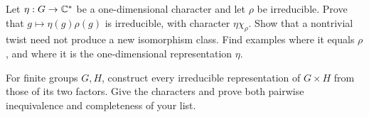 
\begin{exo}
\label{exo-irred-representation-degre-1}
Let $\eta:G\to\mathbb{C}^*$ be a one-dimensional character and let $\rho$
be irreducible. Prove that $g\mapsto\eta(g)\rho(g)$ is irreducible,
with character $\eta\chi_\rho$. Show that a nontrivial twist need not
produce a new isomorphism class. Find examples where it equals $\rho$,
and where it is the one-dimensional representation $\eta$.
\end{exo}


\begin{exo}
\label{exo-representation-product}
For finite groups $G,H$, construct every irreducible representation of
$G\times H$ from those of its two factors. Give the characters and prove
both pairwise inequivalence and completeness of your list.
\end{exo}


